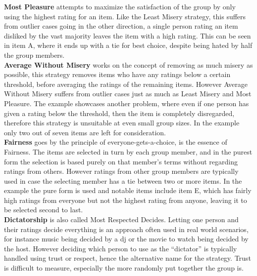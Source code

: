 \textbf{Most Pleasure} attempts to maximize the satisfaction of the group by only using the highest rating for an item. Like the Least Misery strategy, this suffers from outlier cases going in the other direction, a single person rating an item disliked by the vast majority leaves the item with a high rating. This can be seen in item A, where it ends up with a tie for best choice, despite being hated by half the group members.\\

\textbf{Average Without Misery} works on the concept of removing as much misery as possible, this strategy removes items who have any ratings below a certain threshold, before averaging the ratings of the remaining items. However Average Without Misery suffers from outlier cases just as much as Least Misery and Most Pleasure. The example showcases another problem, where even if one person has given a rating below the threshold, then the item is completely disregarded, therefore this strategy is unsuitable at even small group sizes. In the example only two out of seven items are left for consideration.\\

\textbf{Fairness} goes by the principle of everyone-gets-a-choice, is the essence of Fairness. The items are selected in turn by each group member, and in the purest form the selection is based purely on that member's terms without regarding ratings from others. However ratings from other group members are typically used in case the selecting member has a tie between two or more items. In the example the pure form is used and notable items include item E, which has fairly high ratings from everyone but not the highest rating from anyone, leaving it to be selected second to last.\\

\textbf{Dictatorship} is also called Most Respected Decides. Letting one person and their ratings decide everything is an approach often used in real world scenarios, for instance music being decided by a dj or the movie to watch being decided by the host. However deciding which person to use as the “dictator” is typically handled using trust or respect, hence the alternative name for the strategy. Trust is difficult to measure, especially the more randomly put together the group is.

